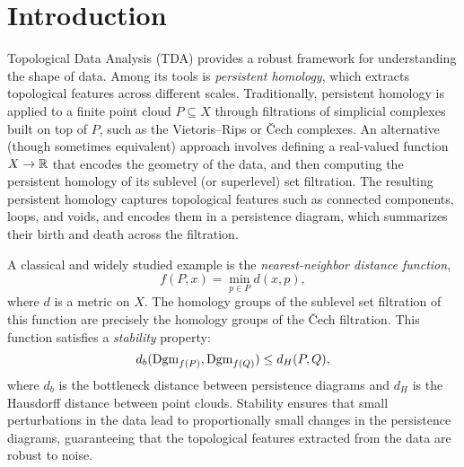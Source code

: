 \newcommand{\package}{\emph}

\chapter{Introduction}
\label{chap:introduction}

Topological Data Analysis (TDA) provides a robust framework for understanding
the shape of data. Among its tools is \emph{persistent homology}, which extracts
topological features across different scales. Traditionally, persistent homology
is applied to a finite point cloud $P \subseteq X$ through filtrations of
simplicial complexes built on top of $P$, such as the Vietoris–Rips or \v{C}ech
complexes. An alternative (though sometimes equivalent) approach involves
defining a real-valued function $X \to \mathbb{R}$ that encodes the geometry of the
data, and then computing the persistent homology of its sublevel (or superlevel)
set filtration. The resulting persistent homology captures topological features
such as connected components, loops, and voids, and encodes them in a
persistence diagram, which summarizes their birth and death across the
filtration.

A classical and widely studied example is the \emph{nearest-neighbor distance
function},
\begin{equation}
    f(P, x) = \min_{p \in P} d(x, p),
\end{equation}
where $d$ is a metric on $X$. The homology groups of the sublevel set filtration
of this function are precisely the homology groups of the \v{C}ech filtration.
This function satisfies a \emph{stability} property:
\begin{equation}
    d_b(\operatorname{Dgm}_{f(P)}, \operatorname{Dgm}_{f(Q)}) \leq d_H(P, Q),
\end{equation}
where $d_b$ is the bottleneck distance between persistence diagrams and $d_H$ is
the Hausdorff distance between point clouds.
Stability ensures that small perturbations in the data lead to proportionally
small changes in the persistence diagrams, guaranteeing that the topological
features extracted from the data are robust to noise.

